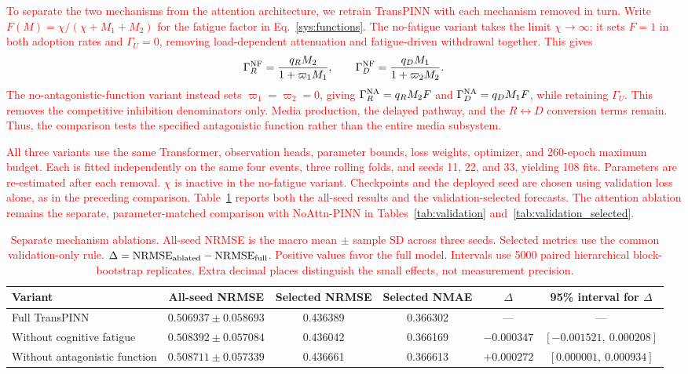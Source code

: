\documentclass[letterpaper,journal]{IEEEtran}
\begin{document}
	\textcolor{red}{To separate the two mechanisms from the attention architecture, we retrain TransPINN with each mechanism removed in turn. Write $F(M)=\chi/(\chi+M_1+M_2)$ for the fatigue factor in Eq.~\eqref{sys:functions}. The no-fatigue variant takes the limit $\chi\to\infty$: it sets $F=1$ in both adoption rates and $\Gamma_U=0$, removing load-dependent attenuation and fatigue-driven withdrawal together. This gives
	\begin{equation}
	\Gamma_R^{\rm NF}=\frac{q_RM_2}{1+\varpi_1M_1},\qquad
	\Gamma_D^{\rm NF}=\frac{q_DM_1}{1+\varpi_2M_2}.
	\end{equation}
	The no-antagonistic-function variant instead sets $\varpi_1=\varpi_2=0$, giving $\Gamma_R^{\rm NA}=q_RM_2F$ and $\Gamma_D^{\rm NA}=q_DM_1F$, while retaining $\Gamma_U$. This removes the competitive inhibition denominators only. Media production, the delayed pathway, and the $R\leftrightarrow D$ conversion terms remain. Thus, the comparison tests the specified antagonistic function rather than the entire media subsystem.}

	\textcolor{red}{
	All three variants use the same Transformer, observation heads, parameter bounds, loss weights, optimizer, and 260-epoch maximum budget. Each is fitted independently on the same four events, three rolling folds, and seeds 11, 22, and 33, yielding 108 fits. Parameters are re-estimated after each removal. $\chi$ is inactive in the no-fatigue variant. Checkpoints and the deployed seed are chosen using validation loss alone, as in the preceding comparison. Table~\ref{tab:mechanism_ablation} reports both the all-seed results and the validation-selected forecasts. The attention ablation remains the separate, parameter-matched comparison with NoAttn-PINN in Tables~\ref{tab:validation} and~\ref{tab:validation_selected}.
	}
	\begin{table}[t]
	\centering
	\caption{\textcolor{red}{Separate mechanism ablations. All-seed NRMSE is the macro mean $\pm$ sample SD across three seeds. Selected metrics use the common validation-only rule. $\Delta={\rm NRMSE}_{\rm ablated}-{\rm NRMSE}_{\rm full}$. Positive values favor the full model. Intervals use 5000 paired hierarchical block-bootstrap replicates. Extra decimal places distinguish the small effects, not measurement precision.}}
	\label{tab:mechanism_ablation}
	\small
	\setlength{\tabcolsep}{5pt}
	\begin{tabular}{lccccc}
	\toprule
	Variant & All-seed NRMSE & Selected NRMSE & Selected NMAE & $\Delta$ & 95\% interval for $\Delta$\\
	\midrule
	Full TransPINN & $0.506937\pm0.058693$ & 0.436389 & 0.366302 & --- & ---\\
	Without cognitive fatigue & $0.508392\pm0.057084$ & 0.436042 & 0.366169 & $-0.000347$ & $[-0.001521,\ 0.000208]$\\
	Without antagonistic function & $0.508711\pm0.057339$ & 0.436661 & 0.366613 & $+0.000272$ & $[0.000001,\ 0.000934]$\\
	\bottomrule
	\end{tabular}
	\end{table}
\end{document}
